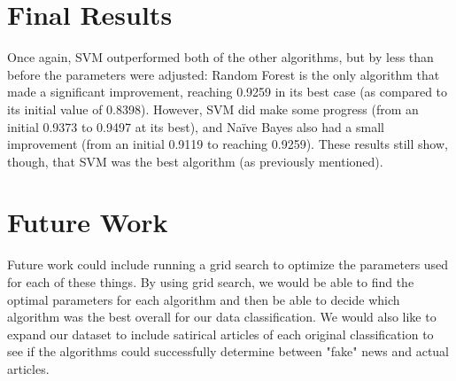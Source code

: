 \documentclass{article}
\begin{document}
    \section{Final Results}
    Once again, SVM outperformed both of the other algorithms, but by less than before the 
    parameters were adjusted: Random Forest is the only algorithm that made a significant 
    improvement, reaching 0.9259 in its best case (as compared to its initial value of 0.8398). 
    However, SVM did make some progress (from an initial 0.9373 to 0.9497 at its best), and Na\"ive 
    Bayes also had a small improvement (from an initial 0.9119 to reaching 0.9259). These results 
    still show, though, that SVM was the best algorithm (as previously mentioned).

    \section{Future Work}
    Future work could include running a grid search to optimize the parameters used for each of 
    these things. By using grid search, we would be able to find the optimal parameters for each 
    algorithm and then be able to decide which algorithm was the best overall for our data 
    classification. We would also like to expand our dataset to include satirical articles of each 
    original classification to see if the algorithms could successfully determine between "fake" 
    news and actual articles.
\end{document}
